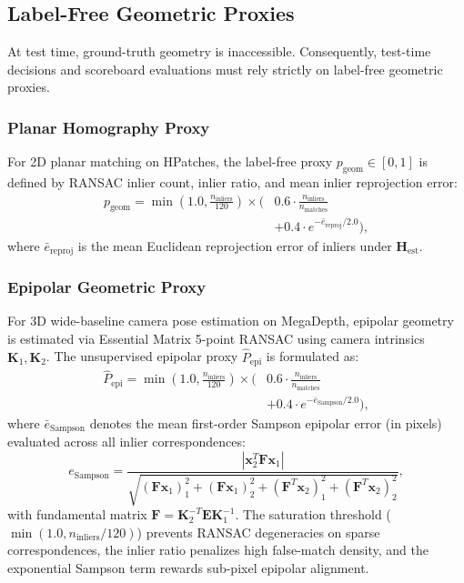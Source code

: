 \documentclass[conference]{IEEEtran}
\begin{document}
\subsection{Label-Free Geometric Proxies}
At test time, ground-truth geometry is inaccessible. Consequently, test-time decisions and scoreboard evaluations must rely strictly on label-free geometric proxies.

\subsubsection{Planar Homography Proxy}
For 2D planar matching on HPatches, the label-free proxy $p_{\text{geom}} \in [0, 1]$ is defined by RANSAC inlier count, inlier ratio, and mean inlier reprojection error:
\begin{equation}
\begin{aligned} p_{\text{geom}} = \min\left(1.0, \frac{n_{\text{inliers}}}{120}\right) \times \Big( &0.6 \cdot \frac{n_{\text{inliers}}}{n_{\text{matches}}} \\ &+ 0.4 \cdot e^{-\bar{e}_{\text{reproj}}/2.0}\Big), \end{aligned}
\end{equation}
where $\bar{e}_{\text{reproj}}$ is the mean Euclidean reprojection error of inliers under $\mathbf{H}_{\text{est}}$.

\subsubsection{Epipolar Geometric Proxy}
For 3D wide-baseline camera pose estimation on MegaDepth, epipolar geometry is estimated via Essential Matrix 5-point RANSAC using camera intrinsics $\mathbf{K}_1, \mathbf{K}_2$. The unsupervised epipolar proxy $\hat{P}_{\text{epi}}$ is formulated as:
\begin{equation}
\begin{aligned} \hat{P}_{\text{epi}} = \min\left(1.0, \frac{n_{\text{inliers}}}{120}\right) \times \Big( &0.6 \cdot \frac{n_{\text{inliers}}}{n_{\text{matches}}} \\ &+ 0.4 \cdot e^{-\bar{e}_{\text{Sampson}}/2.0}\Big), \end{aligned}
\end{equation}
where $\bar{e}_{\text{Sampson}}$ denotes the mean first-order Sampson epipolar error (in pixels) evaluated across all inlier correspondences:
\begin{equation}
e_{\text{Sampson}} = \frac{|\mathbf{x}_2^T \mathbf{F} \mathbf{x}_1|}{\sqrt{(\mathbf{F} \mathbf{x}_1)_1^2 + (\mathbf{F} \mathbf{x}_1)_2^2 + (\mathbf{F}^T \mathbf{x}_2)_1^2 + (\mathbf{F}^T \mathbf{x}_2)_2^2}},
\end{equation}
with fundamental matrix $\mathbf{F} = \mathbf{K}_2^{-T} \mathbf{E} \mathbf{K}_1^{-1}$. The saturation threshold ($\min(1.0, n_{\text{inliers}}/120)$) prevents RANSAC degeneracies on sparse correspondences, the inlier ratio penalizes high false-match density, and the exponential Sampson term rewards sub-pixel epipolar alignment.
\end{document}

